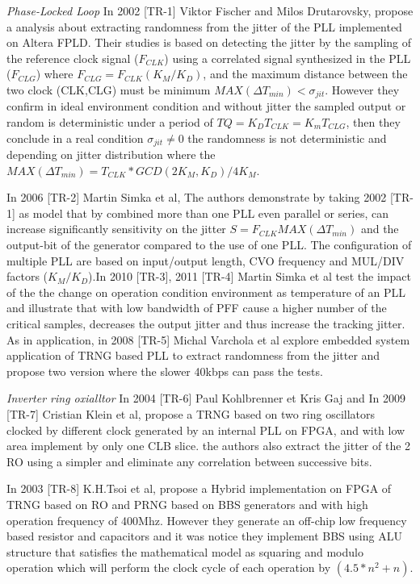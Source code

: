\textit{Phase-Locked Loop} In 2002 [TR-1] Viktor Fischer and Milos Drutarovsky, propose a analysis about extracting randomness from the jitter of the PLL implemented on Altera FPLD. Their studies is based on detecting the jitter by the sampling of the reference clock signal ($F_{CLK}$) using a correlated signal synthesized in the PLL ($F_{CLG}$) where $F_{CLG}=F_{CLK}(K_{M}/K_{D})$, and the maximum distance between the two clock (CLK,CLG) must be minimum $MAX(\Delta T_{min}) < \sigma_{jit}$. However they confirm in ideal environment condition and without jitter the sampled output or random is deterministic under a period of $T{Q}={K_{D}T_{CLK}}={K_{m}T_{CLG}}$, then they conclude in a real condition $\sigma_{jit} \neq 0 $ the randomness is not deterministic and depending on jitter distribution where the $MAX(\Delta T_{min})= T_{CLK}*GCD(2K_{M},K_{D})/4K_{M}$.  

In 2006 [TR-2] Martin Simka et al, The authors demonstrate by taking 2002 [TR-1] as model that by combined more than one PLL even parallel or series, can increase significantly sensitivity on the jitter $S=F_{CLK}MAX(\Delta T_{min})$ and the output-bit of the generator compared to the use of one PLL. The configuration of multiple PLL are based on input/output length, CVO frequency and MUL/DIV factors ($K_{M}/K_{D}$).In 2010 [TR-3], 2011 [TR-4] Martin Simka et al  test the impact of the the change on operation condition environment as temperature of an PLL and illustrate that with low bandwidth of PFF cause a higher number of the critical samples, decreases the output jitter and thus increase the tracking jitter. As in application, in 2008 [TR-5] Michal Varchola et al explore embedded system application of TRNG based PLL to extract randomness from the jitter and propose two version where the slower 40kbps can pass the tests.

\textit{Inverter ring oxialltor} In 2004 [TR-6] Paul Kohlbrenner et Kris Gaj and In 2009 [TR-7] Cristian Klein et al, propose a TRNG based on two ring oscillators clocked by different clock generated by an internal PLL on FPGA, and with low area implement by only one CLB slice. the authors also extract the jitter of the 2 RO using a simpler and eliminate any correlation between successive bits.

In 2003 [TR-8] K.H.Tsoi et al, propose a Hybrid implementation on FPGA of TRNG based on RO and PRNG based on BBS generators and with high operation frequency of 400Mhz. However they generate an off-chip low frequency based resistor and capacitors and it was notice they implement BBS using ALU structure that satisfies the mathematical model as squaring and modulo operation which will perform the clock cycle of each operation by $(4.5*n^{2} + n)$.

